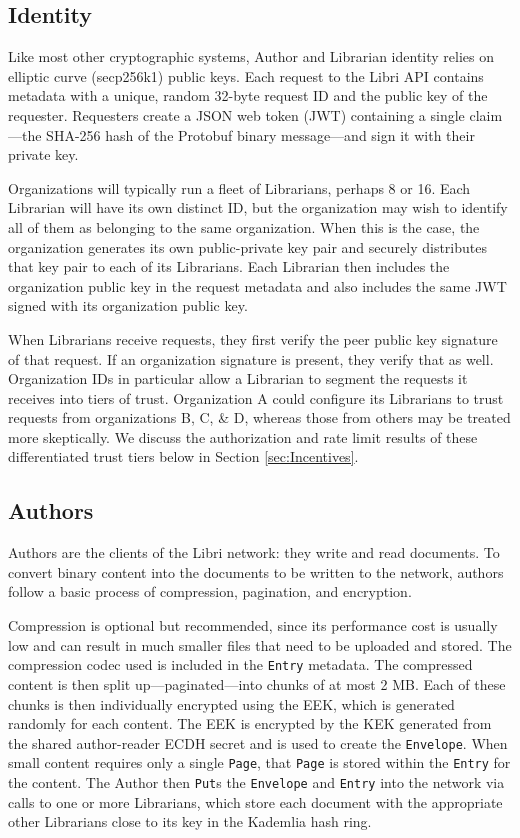 \documentclass[10pt]{article}
\newcommand{\ttt}[1]{\texttt{#1}}
\def\Entry{\ttt{Entry}}
\def\Page{\ttt{Page}}
\def\Envelope{\ttt{Envelope}}
\begin{document}
\subsection{Identity}
\label{sec:Identity}
Like most other cryptographic systems, Author and Librarian identity relies on elliptic curve (secp256k1) public keys. Each request to the Libri API contains metadata with a unique, random 32-byte request ID and the public key of the requester. Requesters create a JSON web token (JWT) containing a single claim---the SHA-256 hash of the Protobuf binary message---and sign it with their private key. 

Organizations will typically run a fleet of Librarians, perhaps 8 or 16. Each Librarian will have its own distinct ID, but the organization may wish to identify all of them as belonging to the same organization. When this is the case, the organization generates its own public-private key pair and securely distributes that key pair to each of its Librarians. Each Librarian then includes the organization public key in the request metadata and also includes the same JWT signed with its organization public key.

When Librarians receive requests, they first verify the peer public key signature of that request. If an organization signature is present, they verify that as well. Organization IDs in particular allow a Librarian to segment the requests it receives into tiers of trust. Organization A could configure its Librarians to trust requests from organizations B, C, \& D, whereas those from others may be treated more skeptically. We discuss the authorization and rate limit results of these differentiated trust tiers below in Section \ref{sec:Incentives}.

\subsection{Authors}
\label{sec:Authors}

Authors are the clients of the Libri network: they write and read documents. To convert binary content into the documents to be written to the network, authors follow a basic process of compression, pagination, and encryption. 

Compression is optional but recommended, since its performance cost is usually low and can result in much smaller files that need to be uploaded and stored. The compression codec used is included in the \Entry{} metadata. The compressed content is then split up---paginated---into chunks of at most 2 MB. Each of these chunks is then individually encrypted using the EEK, which is generated randomly for each content. The EEK is encrypted by the KEK generated from the shared author-reader ECDH secret and is used to create the \Envelope{}. When small content requires only a single \Page{}, that \Page{} is stored within the \Entry{} for the content. The Author then \ttt{Put}s the \Envelope{} and \Entry{} into the network via calls to one or more Librarians, which store each document with the appropriate other Librarians close to its key in the Kademlia hash ring. 
\end{document}
